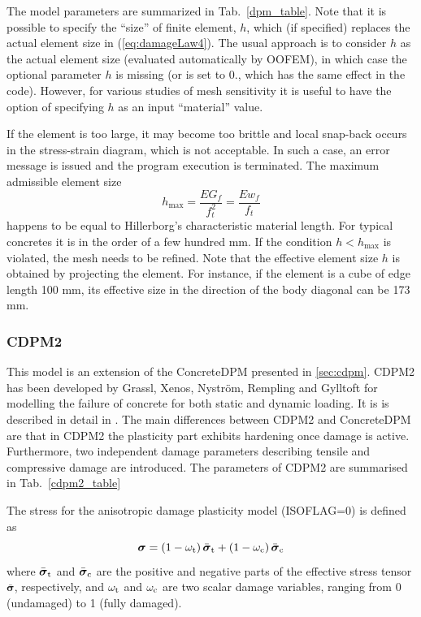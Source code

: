 \documentclass[a4paper]{article}
\begin{document}
The model parameters are summarized
in Tab.~\ref{dpm_table}. Note that it is possible to specify the ``size'' of finite element, $h$, which (if specified) replaces
the actual element size in  (\ref{eq:damageLaw4}). The usual approach is to consider $h$ as the actual element size (evaluated automatically by OOFEM), 
in which case the optional
parameter $h$ is missing (or is set to 0., which has the same effect in the code). However, for various studies of mesh sensitivity
it is useful to have the option of  specifying $h$ as an input ``material'' value.

If the element is too large, it may become too brittle and local snap-back
occurs in the stress-strain diagram, which is not acceptable. 
In such a case, an error message is issued and the program execution
is terminated. The maximum admissible element size 
\begin{equation}
h_{\max} = \frac{EG_f}{f_t^2} = \frac{Ew_f}{f_t}
\end{equation}
happens to be equal to Hillerborg's characteristic material length. 
For typical concretes it is in the order of a few hundred mm. 
If the condition $h<h_{\max}$ is violated, the mesh needs to be refined.
Note that the effective element size $h$ is obtained by projecting the element.
For instance, if the element is a cube of edge length 100 mm, its effective
size in the direction of the body diagonal can be 173 mm. 

\subsubsection{CDPM2}

This model is an extension of the ConcreteDPM presented in \ref{sec:cdpm}.
CDPM2 has been developed by Grassl, Xenos, Nystr\"{o}m, Rempling and Gylltoft for modelling the failure of concrete for both static and dynamic loading. It is is described in detail in \cite{GraXenNys13}.
The main differences between CDPM2 and ConcreteDPM are that in CDPM2 the plasticity part exhibits hardening once damage is active. Furthermore, two independent damage parameters describing tensile and compressive damage are introduced.
The parameters of CDPM2 are summarised in Tab.~\ref{cdpm2_table}

The stress for the anisotropic damage plasticity model (ISOFLAG=0) is defined as
\begin{equation}
\boldsymbol{\sigma} = \left(1-\omega_{\rm t}\right) \bar{\boldsymbol{\sigma}}_{\rm t} + \left(1-\omega_{\rm c}\right) \bar{\boldsymbol{\sigma}}_{\rm c}
\end{equation}
where $\bar{\boldsymbol{\sigma}}_{\rm t}$ and $\bar{\boldsymbol{\sigma}}_{\rm c}$ are the positive and negative parts of the effective stress tensor $\bar{\boldsymbol{\sigma}}$, respectively, and $\omega_{\rm t}$ and $\omega_{\rm c}$ are two scalar damage variables, ranging from 0 (undamaged) to 1 (fully damaged).
\end{document}
